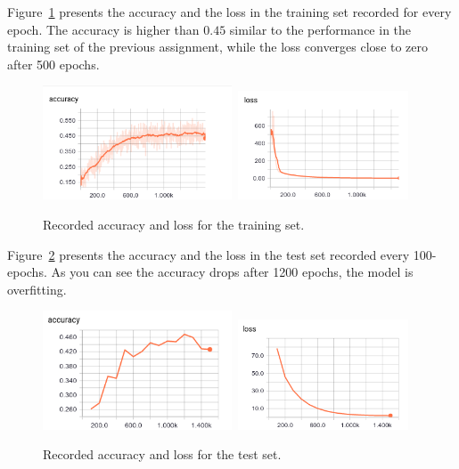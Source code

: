 \documentclass{article}
\begin{document}
Figure~\ref{fig:acclosstrain} presents the accuracy and the loss in the training set recorded for every epoch.
The accuracy is higher than $0.45$ similar to the performance in the training set of the previous assignment, while the loss converges close to zero after 500 epochs.
\begin{figure}
\centering
\includegraphics[width=0.5\textwidth]{loss.png}\	
\includegraphics[width=0.45\textwidth]{accuracy.png}
\caption{Recorded accuracy and loss for the training set.}
\label{fig:acclosstrain}
\end{figure}
Figure~\ref{fig:acclosstest} presents the accuracy and the loss in the test set recorded every 100-epochs.
As you can see the accuracy drops after 1200 epochs, the model is overfitting.


\begin{figure}
\centering
\includegraphics[width=0.5\textwidth]{accuracy_t.png}\	
\includegraphics[width=0.45\textwidth]{loss_t.png}
\caption{Recorded accuracy and loss for the test set.}
\label{fig:acclosstest}
\end{figure}
\end{document}
